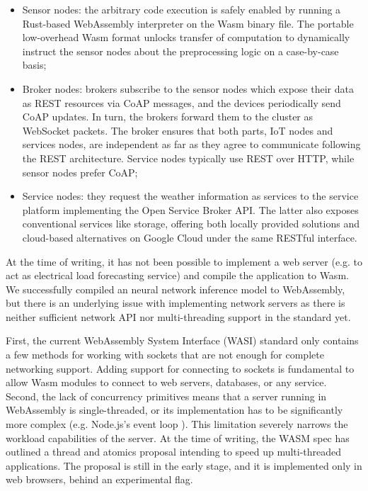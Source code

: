 \begin{itemize}
    \item Sensor nodes: the arbitrary code execution is safely enabled by running a Rust-based WebAssembly interpreter on the Wasm binary file. The portable low-overhead Wasm format unlocks transfer of computation to dynamically instruct the sensor nodes about the preprocessing logic on a case-by-case basis;
    \item Broker nodes: brokers subscribe to the sensor nodes which expose their data as REST resources via CoAP messages, and the devices periodically send CoAP updates. In turn, the brokers forward them to the cluster as WebSocket packets. The broker ensures that both parts, IoT nodes and services nodes, are independent as far as they agree to communicate following the REST architecture. Service nodes typically use REST over HTTP, while sensor nodes prefer CoAP;
    \item Service nodes: they request the weather information as services to the service platform implementing the Open Service Broker API. The latter also exposes conventional services like storage, offering both locally provided solutions and cloud-based alternatives on Google Cloud under the same RESTful interface. 
\end{itemize}

At the time of writing, it has not been possible to implement a web server (e.g. to act as electrical load forecasting service) and compile the application to Wasm. We successfully compiled an neural network inference model to WebAssembly, but there is an underlying issue with implementing network servers as there is neither sufficient network API nor multi-threading support in the standard yet.

First, the current WebAssembly System Interface (WASI) standard only contains a few methods for working with sockets that are not enough for complete networking support. Adding support for connecting to sockets is fundamental to allow Wasm modules to connect to web servers, databases, or any service. \\
Second, the lack of concurrency primitives means that a server running in WebAssembly is single-threaded, or its implementation has to be significantly more complex (e.g. Node.js's event loop \cite{nodejs-event-loop}). This limitation severely narrows the workload capabilities of the server. At the time of writing, the WASM spec has outlined a thread and atomics proposal intending to speed up multi-threaded applications. The proposal is still in the early stage, and it is implemented only in web browsers, behind an experimental flag.

